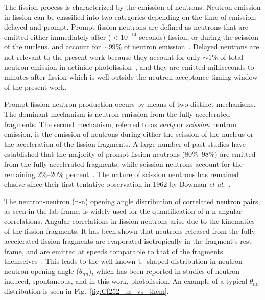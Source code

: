 The fission process is characterized by the emission of neutrons.
Neutron emission in fission can be classified into two categories depending on the time of emission: delayed and prompt.
Prompt fission neutrons are defined as neutrons that are emitted either immediately after ($<10^{-14}$ seconds) fission, or during the scission of the nucleus, and account for $\sim99\%$ of neutron emission~\cite{Caldwell2017DelayedNs}.
Delayed neutrons are not relevant to the present work because they account for only $\sim1\%$ of total neutron emission in actinide photofission~\cite{Caldwell2017DelayedNs}, and they are emitted milliseconds to minutes after fission which is well outside the neutron acceptance timing window of the present work.

Prompt fission neutron production occurs by means of two distinct mechanisms.
The dominant mechanism is neutron emission from the fully accelerated fragments.
The second mechanism, referred to as \textit{early} or \textit{scission} neutron emission, is the emission of neutrons during either the scission of the nucleus or the acceleration of the fission fragments.
A large number of past studies have established that the majority of prompt fission neutrons (80\%--98\%) are emitted from the fully accelerated fragments, while scission neutrons account for the remaining 2\%--20\% percent~\cite{Scission2005}.
The nature of scission neutrons has remained elusive since their first tentative observation in 1962 by Bowman \emph{et al.}~\cite{Bowman}.

The neutron-neutron (n-n) opening angle distribution of correlated neutron pairs, as seen in the lab frame, is widely used for the quantification of n-n angular correlations.
Angular correlations in fission neutrons arise due to the kinematics of the fission fragments.
It has been shown that neutrons released from the fully accelerated fission fragments are evaporated isotropically in the fragment's rest frame, and are emitted at speeds comparable to that of the fragments themselves~\cite{JORGENSEN}.
This leads to the well-known U--shaped distribution in neutron-neutron opening angle ($\theta_{nn}$), which has been reported in studies of neutron-induced, spontaneous, and in this work, photofission.
An example of a typical $\theta_{nn}$ distribution is seen in Fig.~\ref{fig:Cf252_us_vs_them}.

